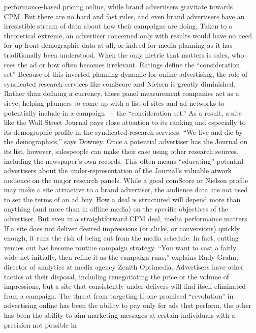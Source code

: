 performance‐based pricing online, while brand advertisers gravitate
towards CPM. But there are no hard and fast rules, and even brand
advertisers have an irresistible stream of data about how their campaigns
are doing. Taken to a theoretical extreme, an advertiser concerned only
with results would have no need for up‐front demographic data at all, or
indeed for media planning as it has traditionally been understood. When
the only metric that matters is sales, who sees the ad or how often
becomes irrelevant.
Ratings define the ``consideration set''
Because of this inverted planning dynamic for online advertising, the role
of syndicated research services like comScore and Nielsen is greatly
diminished. Rather than defining a currency, these panel measurement
companies act as a sieve, helping planners to come up with a list of sites
and ad networks to potentially include in a campaign — the
``consideration set.''
As a result, a site like the Wall Street Journal pays close attention to its
ranking and especially to its demographic profile in the syndicated
research services. ``We live and die by the demographics,'' says Downey.
Once a potential advertiser has the Journal on its list, however, salespeople
can make their case using other research sources, including the
newspaper’s own records. This often means ``educating'' potential
advertisers about the under‐representation of the Journal’s valuable atwork
audience on the major research panels.
While a good comScore or Nielsen profile may make a site attractive to a
brand advertiser, the audience data are not used to set the terms of an ad
buy. How a deal is structured will depend more than anything (and more
than in offline media) on the specific objectives of the advertiser. But even
in a straightforward CPM deal, media performance matters. If a site does
not deliver desired impressions (or clicks, or conversions) quickly enough,
it runs the risk of being cut from the media schedule.
In fact, cutting venues out has become routine campaign strategy. ``You
want to cast a fairly wide net initially, then refine it as the campaign
runs,'' explains Rudy Grahn, director of analytics at media agency Zenith
Optimedia. Advertisers have other tactics at their disposal, including
renegotiating the price or the volume of impressions, but a site that
consistently under‐delivers will find itself eliminated from a campaign.
The threat from targeting
If one promised ``revolution'' in advertising online has been the ability to
pay only for ads that perform, the other has been the ability to aim
marketing messages at certain individuals with a precision not possible in

